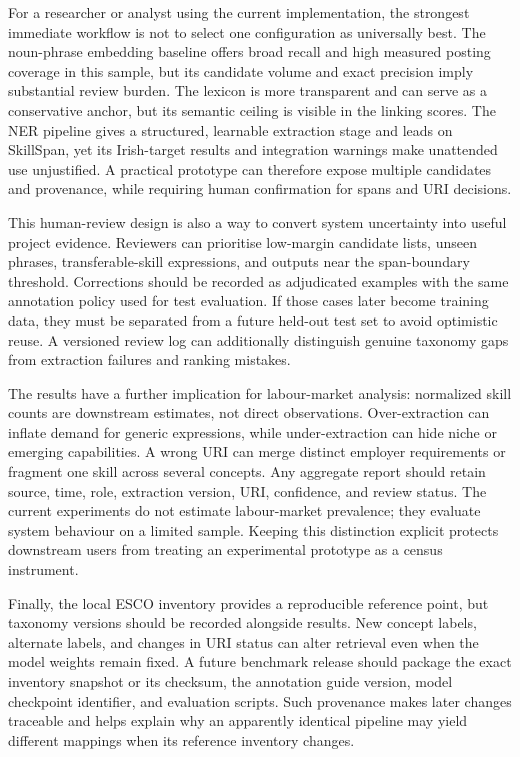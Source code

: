 \documentclass[conference]{IEEEtran}
\begin{document}
For a researcher or analyst using the current implementation, the strongest immediate workflow is not to select one configuration as universally best. The noun-phrase embedding baseline offers broad recall and high measured posting coverage in this sample, but its candidate volume and exact precision imply substantial review burden. The lexicon is more transparent and can serve as a conservative anchor, but its semantic ceiling is visible in the linking scores. The NER pipeline gives a structured, learnable extraction stage and leads on SkillSpan, yet its Irish-target results and integration warnings make unattended use unjustified. A practical prototype can therefore expose multiple candidates and provenance, while requiring human confirmation for spans and URI decisions.

This human-review design is also a way to convert system uncertainty into useful project evidence. Reviewers can prioritise low-margin candidate lists, unseen phrases, transferable-skill expressions, and outputs near the span-boundary threshold. Corrections should be recorded as adjudicated examples with the same annotation policy used for test evaluation. If those cases later become training data, they must be separated from a future held-out test set to avoid optimistic reuse. A versioned review log can additionally distinguish genuine taxonomy gaps from extraction failures and ranking mistakes.

The results have a further implication for labour-market analysis: normalized skill counts are downstream estimates, not direct observations. Over-extraction can inflate demand for generic expressions, while under-extraction can hide niche or emerging capabilities. A wrong URI can merge distinct employer requirements or fragment one skill across several concepts. Any aggregate report should retain source, time, role, extraction version, URI, confidence, and review status. The current experiments do not estimate labour-market prevalence; they evaluate system behaviour on a limited sample. Keeping this distinction explicit protects downstream users from treating an experimental prototype as a census instrument.

Finally, the local ESCO inventory provides a reproducible reference point, but taxonomy versions should be recorded alongside results. New concept labels, alternate labels, and changes in URI status can alter retrieval even when the model weights remain fixed. A future benchmark release should package the exact inventory snapshot or its checksum, the annotation guide version, model checkpoint identifier, and evaluation scripts. Such provenance makes later changes traceable and helps explain why an apparently identical pipeline may yield different mappings when its reference inventory changes.
\end{document}

